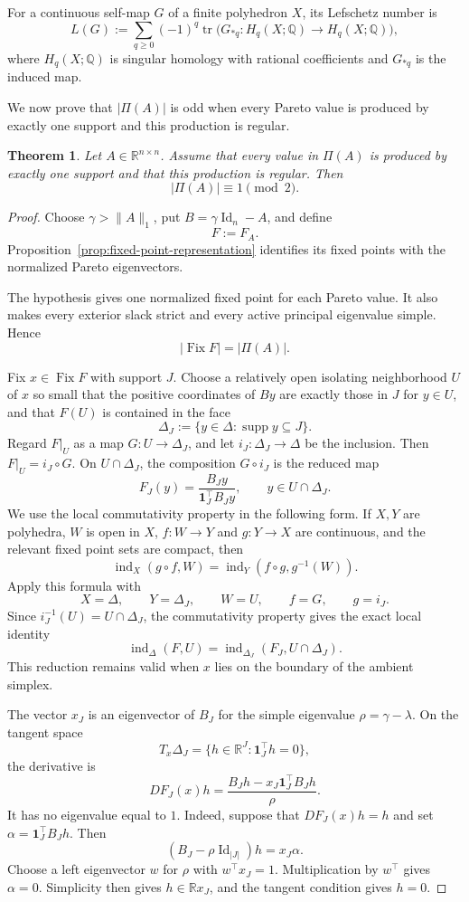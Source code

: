 \documentclass[11pt,a4paper]{article}
\newtheorem{theorem}{Theorem}[section]
\theoremstyle{definition}
\newcommand{\R}{\mathbb R}
\newcommand{\Id}{\operatorname{Id}}
\newcommand{\one}{\mathbf 1}
\newcommand{\supp}{\operatorname{supp}}
\newcommand{\Fix}{\operatorname{Fix}}
\newcommand{\ind}{\operatorname{ind}}
\begin{document}
For a continuous self-map $G$ of a finite polyhedron $X$, its
Lefschetz number is
$$
L(G)
:=
\sum_{q\geq0}(-1)^q
\operatorname{tr}\bigl(
G_{*q}:H_q(X;\mathbb Q)\to H_q(X;\mathbb Q)
\bigr),
$$
where $H_q(X;\mathbb Q)$ is singular homology with rational
coefficients and $G_{*q}$ is the induced map.

We now prove that $|\Pi(A)|$ is odd when every Pareto value is produced
by exactly one support and this production is regular.

\begin{theorem}
\label{thm:parity}
Let $A\in\R^{n\times n}$. Assume that every value in $\Pi(A)$ is
produced by exactly one support and that this production is regular.
Then
$$
|\Pi(A)|\equiv1\pmod2.
$$
\end{theorem}

\begin{proof}
Choose $\gamma>\|A\|_1$, put $B=\gamma\Id_n-A$, and define
$$
F:=F_A.
$$
Proposition~\ref{prop:fixed-point-representation} identifies its fixed
points with the normalized Pareto eigenvectors.

The hypothesis gives one normalized fixed point for each Pareto value.
It also makes every exterior slack strict and every active principal
eigenvalue simple. Hence
$$
|\Fix F|=|\Pi(A)|.
$$

Fix $x\in\Fix F$ with support $J$. Choose a relatively open isolating
neighborhood $U$ of $x$ so small that the positive coordinates of
$By$ are exactly those in $J$ for $y\in U$, and that $F(U)$ is
contained in the face
$$
\Delta_J:=\{y\in\Delta:\supp y\subseteq J\}.
$$
Regard $F|_U$ as a map $G:U\to\Delta_J$, and let
$i_J:\Delta_J\to\Delta$ be the inclusion. Then
$F|_U=i_J\circ G$. On $U\cap\Delta_J$, the composition
$G\circ i_J$ is the reduced map
$$
F_J(y)
=
\frac{B_Jy}{\one_J^\top B_Jy},
\qquad
y\in U\cap\Delta_J.
$$
We use the local commutativity property in the following form. If
$X,Y$ are polyhedra, $W$ is open in $X$, $f:W\to Y$ and $g:Y\to X$
are continuous, and the relevant fixed point sets are compact, then
$$
\ind_X(g\circ f,W)
=
\ind_Y(f\circ g,g^{-1}(W)).
$$
Apply this formula with
$$
X=\Delta,
\qquad
Y=\Delta_J,
\qquad
W=U,
\qquad
f=G,
\qquad
g=i_J.
$$
Since $i_J^{-1}(U)=U\cap\Delta_J$, the commutativity property
\cite[Section~12, Theorem~6.2(VII), pp.~317-318]{GranasDugundji2003} gives the exact
local identity
$$
\ind_\Delta(F,U)
=
\ind_{\Delta_J}(F_J,U\cap\Delta_J).
$$
This reduction remains valid when $x$ lies on the boundary of the
ambient simplex.

The vector $x_J$ is an eigenvector of $B_J$ for the simple eigenvalue
$\rho=\gamma-\lambda$. On the tangent space
$$
T_x\Delta_J
=
\{h\in\R^J:\one_J^\top h=0\},
$$
the derivative is
$$
DF_J(x)h
=
\frac{B_Jh-x_J\one_J^\top B_Jh}{\rho}.
$$
It has no eigenvalue equal to $1$. Indeed, suppose that
$DF_J(x)h=h$ and set $\alpha=\one_J^\top B_Jh$. Then
$$
(B_J-\rho\Id_{|J|})h=x_J\alpha.
$$
Choose a left eigenvector $w$ for $\rho$ with $w^\top x_J=1$.
Multiplication by $w^\top$ gives $\alpha=0$. Simplicity then gives
$h\in\R x_J$, and the tangent condition gives $h=0$.


\end{proof}
\end{document}
